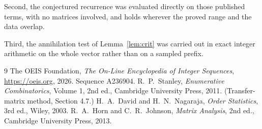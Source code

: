 \documentclass[11pt,a4paper]{article}
\theoremstyle{plain}
\theoremstyle{definition}
\begin{document}
Second, the conjectured recurrence was evaluated directly on those published terms, with no
matrices involved, and holds wherever the proved range and the data overlap.

Third, the annihilation test of Lemma~\ref{lem:crit} was carried out in exact integer
arithmetic on the whole vector rather than on a sampled prefix.

\begin{thebibliography}{9}
 The OEIS Foundation, \emph{The On-Line Encyclopedia of Integer
Sequences}, \url{https://oeis.org}, 2026. Sequence A236904.
 R.~P.~Stanley, \emph{Enumerative Combinatorics}, Volume 1, 2nd ed.,
Cambridge University Press, 2011. (Transfer-matrix method, Section 4.7.)
 H.~A.~David and H.~N.~Nagaraja, \emph{Order Statistics}, 3rd ed., Wiley,
2003.
 R.~A.~Horn and C.~R.~Johnson, \emph{Matrix Analysis}, 2nd ed., Cambridge
University Press, 2013.
\end{thebibliography}
\end{document}
